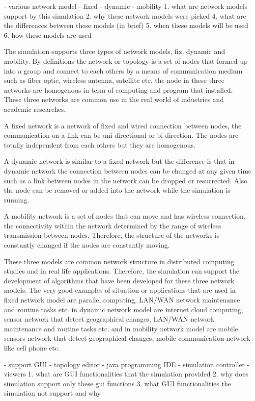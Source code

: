- various network model
	- fixed
	- dynamic
	- mobility
1. what are network models support by this simulation
2. why these network models were picked
4. what are the differences between these models (in brief)
5. when these models will be used
6. how these models are used

The simulation supports three types of network models, fix, dynamic and mobility. By definitions the network or topology is a set of nodes that formed up into a group and connect to each others by a means of communication medium such as fiber optic, wireless antenna, satellite etc. the node in these three networks are homogenous in term of computing and program that installed. These three networks are common use in the real world of industries and academic researches.

A fixed network is a network of fixed and wired connection between nodes, the communication on a link can be uni-directional or bi-direction. The nodes are totally independent from each others but they are homogenous.

A dynamic network is similar to a fixed network but the difference is that in dynamic network the connection between nodes can be changed at any given time such as a link between nodes in the network can be dropped or resurrected. Also the node can be removed or added into the network while the simulation is running.

A mobility network is a set of nodes that can move and has wireless connection, the connectivity within the network determined by the range of wireless transmission between nodes. Therefore, the structure of the networks is constantly changed if the nodes are constantly moving.

These three models are common network structure in distributed computing studies and in real life applications. Therefore, the simulation can support the development of algorithms that have been developed for these three network models. The very good examples of situation or applications that are used in fixed network model are parallel computing, LAN/WAN network maintenance and routine tasks etc. in dynamic network model are internet cloud computing, sensor network that detect geographical changes, LAN/WAN network maintenance and routine tasks etc. and in mobility network model are mobile sensors network that detect geographical changes, mobile communication network like cell phone etc.


- support GUI
	- topology editor
	- java programming IDE
	- simulation controller
    - viewers
1. what are GUI functionalities that the simulation provided
2. why does simulation support only these gui functions
3. what GUI functionalities the simulation not support and why

